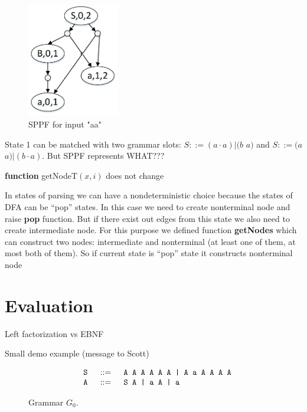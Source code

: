 \documentclass[runningheads,a4paper]{llncs}
\begin{document}
\begin{figure}
    \centering
    \includegraphics[width=4cm]{pictures/SPPFforG0.pdf}
    \caption{SPPF for input "aa"}
    \label{fig:SPPF}
\end{figure}


State 1 can be matched with two grammar slots: $S ::= (a \cdot a)|(b$ $a)$ and $S ::= (a$ $a)|(b \cdot a)$. 
But SPPF represents WHAT???




\textbf{function} getNodeT$(x,i)$ does not change

In states of parsing we can have a nondeterministic choice because the states of DFA can be ``pop'' states.
In this case we need to create nonterminal node and raise \textbf{pop} function. But if there exist out edges from this state we also need to create intermediate node.
For this purpose we defined function \textbf{getNodes} which can construct two nodes: intermediate and nonterminal (at least one of them, at most both of them).
So if current state is ``pop'' state it constructs nonterminal node






\section{Evaluation}

Left factorization vs EBNF

Small demo example (message to Scott)

\begin{figure}[h]
$$
\begin{array}{crcl}
& \mbox{\texttt{ S }} &::=& \mbox{\texttt{ A A A A A A | A a A A A A }} \\
& \mbox{\texttt{ A }} & ::=& \mbox{\texttt{ S A | a A | a}}\\
\end{array}
$$
\caption{Grammar $G_0$.}
\label{testGrammar}
\end{figure}
\end{document}
